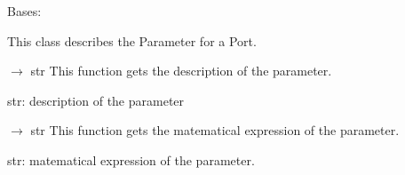 \documentclass[letterpaper,10pt,english]{sphinxmanual}
\begin{document}
\begin{fulllineitems}
\label{\detokenize{scrimp:scrimp.port.Parameter}}
\pysigstartsignatures
\pysiglinewithargsret
{}
{\sphinxparamcomma {}\sphinxparamcomma {}\sphinxparamcomma {}\sphinxparamcomma {}}
{}
\pysigstopsignatures
\sphinxAtStartPar
Bases: 

\sphinxAtStartPar
This class describes the Parameter for a Port.

\begin{fulllineitems}
\label{\detokenize{scrimp:scrimp.port.Parameter.get_description}}
\pysigstartsignatures
\pysiglinewithargsret
{}
{}
{{ $\rightarrow$ str}}
\pysigstopsignatures
\sphinxAtStartPar
This function gets the description of the parameter.
\begin{description}
\sphinxAtStartPar
str: description of the parameter

\end{description}

\end{fulllineitems}


\begin{fulllineitems}
\label{\detokenize{scrimp:scrimp.port.Parameter.get_expression}}
\pysigstartsignatures
\pysiglinewithargsret
{}
{}
{{ $\rightarrow$ str}}
\pysigstopsignatures
\sphinxAtStartPar
This function gets the matematical expression of the parameter.
\begin{description}
\sphinxAtStartPar
str: matematical expression of the parameter.

\end{description}


\end{fulllineitems}
\end{fulllineitems}
\end{document}
